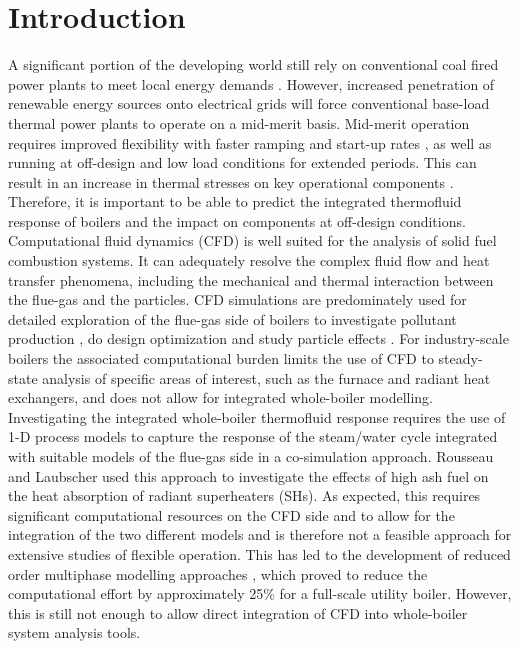 \documentclass[a4paper,fleqn]{cas-dc}
\begin{document}
\maketitle

\section{Introduction}\label{intro}
A significant portion of the developing world still rely on conventional coal fired power plants to meet local energy demands \cite{Rousseau2020}. However, increased penetration of renewable energy sources onto electrical grids will force conventional base-load thermal power plants to operate on a mid-merit basis. Mid-merit operation requires improved flexibility with faster ramping and start-up rates \cite{Safdarnejad2019}, as well as running at off-design and low load conditions for extended periods. This can result in an increase in thermal stresses on key operational components \cite{Modlinski2019}. Therefore, it is important to be able to predict the integrated thermofluid response of boilers and the impact on components at off-design conditions.\\

Computational fluid dynamics (CFD) is well suited for the analysis of solid fuel combustion systems. It can adequately resolve the complex fluid flow and heat transfer phenomena, including the mechanical and thermal interaction between the flue-gas and the particles. CFD simulations are predominately used for detailed exploration of the flue-gas side of boilers to investigate pollutant production \cite{Liu2021}, do design optimization \cite{dugum2019, Gu2020} and study particle effects \cite{Laubscher2020}. For industry-scale boilers the associated computational burden limits the use of CFD to steady-state analysis of specific areas of interest, such as the furnace and radiant heat exchangers, and does not allow for integrated whole-boiler modelling.\\

Investigating the integrated whole-boiler thermofluid response requires the use of 1-D process models to capture the response of the steam/water cycle integrated with suitable models of the flue-gas side in a co-simulation approach. Rousseau and Laubscher \cite{Rousseau2020} used this approach to investigate the effects of high ash fuel on the heat absorption of radiant superheaters (SHs). As expected, this requires significant computational resources on the CFD side and to allow for the integration of the two different models and is therefore not a feasible approach for extensive studies of flexible operation. This has led to the development of reduced order multiphase modelling approaches \cite{Rawlins2022}, which proved to reduce the computational effort by approximately 25\% for a full-scale utility boiler.  However, this is still not enough to allow direct integration of CFD into whole-boiler system analysis tools. \\
\end{document}
